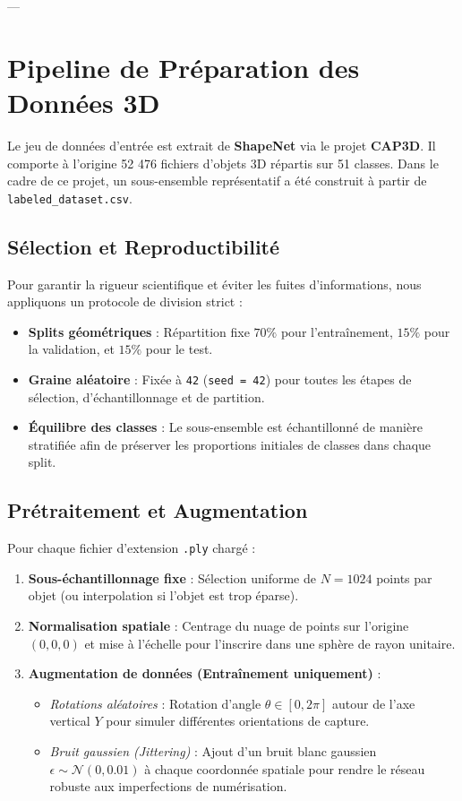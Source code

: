 \documentclass[11pt,a4paper]{article}
\begin{document}
---

\section{Pipeline de Préparation des Données 3D}
Le jeu de données d'entrée est extrait de \textbf{ShapeNet} via le projet \textbf{CAP3D}. Il comporte à l'origine 52 476 fichiers d'objets 3D répartis sur 51 classes. Dans le cadre de ce projet, un sous-ensemble représentatif a été construit à partir de \texttt{labeled\_dataset.csv}.

\subsection{Sélection et Reproductibilité}
Pour garantir la rigueur scientifique et éviter les fuites d'informations, nous appliquons un protocole de division strict :
\begin{itemize}
    \item \textbf{Splits géométriques} : Répartition fixe $70\%$ pour l'entraînement, $15\%$ pour la validation, et $15\%$ pour le test.
    \item \textbf{Graine aléatoire} : Fixée à \texttt{42} (\texttt{seed = 42}) pour toutes les étapes de sélection, d'échantillonnage et de partition.
    \item \textbf{Équilibre des classes} : Le sous-ensemble est échantillonné de manière stratifiée afin de préserver les proportions initiales de classes dans chaque split.
\end{itemize}

\subsection{Prétraitement et Augmentation}
Pour chaque fichier d'extension \texttt{.ply} chargé :
\begin{enumerate}
    \item \textbf{Sous-échantillonnage fixe} : Sélection uniforme de $N = 1024$ points par objet (ou interpolation si l'objet est trop éparse).
    \item \textbf{Normalisation spatiale} : Centrage du nuage de points sur l'origine $(0,0,0)$ et mise à l'échelle pour l'inscrire dans une sphère de rayon unitaire.
    \item \textbf{Augmentation de données (Entraînement uniquement)} : 
    \begin{itemize}
        \item \textit{Rotations aléatoires} : Rotation d'angle $\theta \in [0, 2\pi]$ autour de l'axe vertical $Y$ pour simuler différentes orientations de capture.
        \item \textit{Bruit gaussien (Jittering)} : Ajout d'un bruit blanc gaussien $\epsilon \sim \mathcal{N}(0, 0.01)$ à chaque coordonnée spatiale pour rendre le réseau robuste aux imperfections de numérisation.
    \end{itemize}
\end{enumerate}
\end{document}
